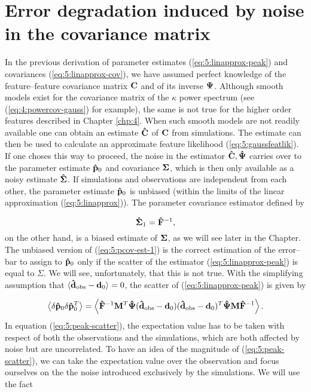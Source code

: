 \section{Error degradation induced by noise in the covariance matrix}
\label{sec:5:degrade}
In the previous derivation of parameter estimates (\ref{eq:5:linapprox-peak}) and covariances (\ref{eq:5:linapprox-cov}), we have assumed perfect knowledge of the feature--feature covariance matrix $\mathbf{C}$ and of its inverse $\mathbf{\Psi}$. Although smooth models exist for the covariance matrix of the $\kappa$ power spectrum (see (\ref{eq:4:powercov-gauss}) for example), the same is not true for the higher order features described in Chapter \ref{chp:4}. When such smooth models are not readily available one can obtain an estimate $\mathbf{\hat{C}}$ of $\mathbf{C}$ from simulations. The estimate can then be used to calculate an approximate feature likelihood (\ref{eq:5:gaussfeatlik}). If one choses this way to proceed, the noise in the estimator $\mathbf{\hat{C}},\mathbf{\hat{\Psi}}$ carries over to the parameter estimate $\mathbf{\hat{p}}_0$ and covariance $\mathbf{\Sigma}$, which is then only available as a noisy estimate $\mathbf{\hat{\Sigma}}$. If simulations and observations are independent from each other, the parameter estimate $\mathbf{\hat{p}}_0$ is unbiased (within the limits of the linear approximation (\ref{eq:5:linapprox})). The parameter covariance estimator defined by

\begin{equation}
\label{eq:5:pcov-est-1}
\mathbf{\hat{\Sigma}}_1 = \mathbf{\hat{F}}^{-1},
\end{equation}
%
on the other hand, is a biased estimate of $\mathbf{\Sigma}$, as we will see later in the Chapter. The unbiased version of (\ref{eq:5:pcov-est-1}) is the correct estimation of the error--bar to assign to $\mathbf{\hat{p}}_0$ only if the scatter of the estimator (\ref{eq:5:linapprox-peak}) is equal to $\Sigma$. We will see, unfortunately, that this is not true. With the simplifying assumption that $\langle\mathbf{\hat{d}}_{\rm obs}-\mathbf{d}_0\rangle=0$, the scatter of (\ref{eq:5:linapprox-peak}) is given by

\begin{equation}
\label{eq:5:peak-scatter}
\left\langle\delta\mathbf{\hat{p}}_0\delta\mathbf{\hat{p}}_0^T\right\rangle = \left\langle\mathbf{\hat{F}}^{-1}\mathbf{M}^T\mathbf{\hat{\Psi}}(\mathbf{\hat{d}}_{\rm obs}-\mathbf{d}_0)(\mathbf{\hat{d}}_{\rm obs}-\mathbf{d}_0)^T\mathbf{\hat{\Psi}}\mathbf{M}\mathbf{\hat{F}}^{-1}\right\rangle.
\end{equation}
%
In equation (\ref{eq:5:peak-scatter}), the expectation value has to be taken with respect of both the observations and the simulations, which are both affected by noise but are uncorrelated. To have an idea of the magnitude of (\ref{eq:5:peak-scatter}), we can take the expectation value over the observation and focus ourselves on the the noise introduced exclusively by the simulations. We will use the fact

